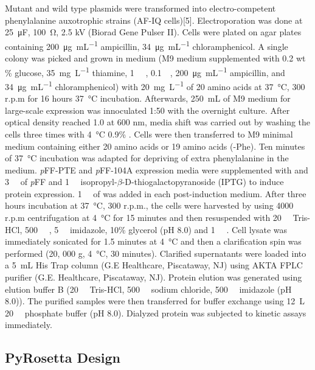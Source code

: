 \begin{refsection}
Mutant and wild type plasmids were transformed into electro-competent  phenylalanine auxotrophic strains (AF-IQ cells)[5]. Electroporation was
done at \SI{25}{\micro\farad}, \SI{100}{\ohm}, 2.5 kV (Biorad Gene Pulser II).
Cells were plated on agar plates containing \SI{200}{\ug\per\mL} ampicillin,
\SI{34}{\ug\per\mL} chloramphenicol. A single colony was picked and grown in
medium (M9 medium supplemented with 0.2 wt \% glucose, \SI{35}{\mg\per\L}
thiamine, \SI{1}{\milli\Molar} , \SI{0.1}{\milli\Molar},
\SI{200}{\ug\per\mL} ampicillin, and \SI{34}{\ug\per\mL} chloramphenicol) with
\SI{20}{\mg\per\L} of 20 amino acids at \SI{37}{\celsius}, 300 r.p.m for 16
hours \SI{37}{\celsius} incubation.  Afterwards, \SI{250}{\mL} of M9 medium for
large-scale expression was innoculated 1:50 with the overnight culture.  After
optical density reached 1.0 at 600 nm, media shift was carried out by washing
the cells three times with \SI{4}{\celsius} 0.9\% . Cells were then
transferred to M9 minimal medium containing either 20 amino acids or 19 amino
acids (-Phe). Ten minutes of \SI{37}{\celsius} incubation was adapted for
depriving of extra phenylalanine in the medium. \emph{p}FF-PTE and
\emph{p}FF-104A expression media were supplemented with and
\SI{3}{\milli\Molar} of \emph{p}FF and \SI{1}{\milli\Molar}
isopropyl-$\beta$-D-thiogalactopyranoside (IPTG) to induce protein expression.
\SI{1}{\milli\Molar} of  was added in each post-induction medium.
After three hours incubation at \SI{37}{\celsius}, 300 r.p.m., the cells were
harvested by using 4000 r.p.m centrifugation at \SI{4}{\celsius} for 15 minutes
and then resuspended with \SI{20}{\milli\Molar} Tris-HCl,
\SI{500}{\milli\Molar} , \SI{5}{\milli\Molar} imidazole, 10\% glycerol
(pH 8.0) and \SI{1}{\micro\Molar} . Cell lysate was immediately
sonicated for 1.5 minutes at \SI{4}{\celsius} and then a clarification spin was
performed (20, 000 g, \SI{4}{\celsius}, 30 minutes).  Clarified supernatants
were loaded into a \SI{5}{\mL} His Trap column (G.E Healthcare, Piscataway, NJ)
using AKTA FPLC purifier (G.E.  Healthcare, Piscataway, NJ).  Protein elution
was generated using elution buffer B (\SI{20}{\milli\Molar} Tris-HCl,
\SI{500}{\milli\Molar} sodium chloride, \SI{500}{\milli\Molar} imidazole (pH
8.0)).  The purified samples were then transferred for buffer exchange using
\SI{12}{\L} \SI{20}{\milli\Molar} phosphate buffer (pH 8.0).  Dialyzed protein
was subjected to kinetic assays immediately.

\subsection{PyRosetta Design}
\label{sec:pyrosetta-method}


\end{refsection}
